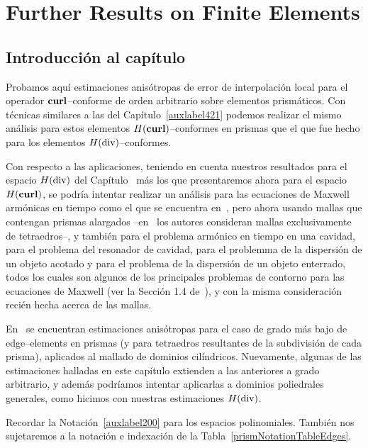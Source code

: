 \chapter{Further Results on Finite Elements}
\label{auxlabel202}
\section*{Introducci\'on al cap\'itulo}

Probamos aqu\'i estimaciones anis\'otropas de error de interpolaci\'on local
para el operador $\textbf{curl}$--conforme de orden arbitrario sobre elementos
prism\'aticos. 
Con t\'ecnicas similares a las del Cap\'itulo~\ref{auxlabel421}
podemos realizar el mismo 
an\'alisis para estos elementos $H(\textbf{curl})$--conformes en prismas
que el que fue hecho para los elementos $H(\operatorname{\textrm{div}})$--conformes.

Con respecto a las aplicaciones, 
teniendo en cuenta nuestros resultados para el espacio $H(\operatorname{\textrm{div}})$ 
del Cap\'itulo~\cite{auxlabel421} m\'as los que presentaremos
ahora para el espacio $H(\textbf{curl})$, se podr\'ia intentar realizar
un an\'alisis para las ecuaciones de Maxwell arm\'onicas en tiempo
como el que se encuentra en~\cite{buffaCostabelDauge}, pero
ahora usando mallas que contengan prismas alargados 
--en~\cite{buffaCostabelDauge} los autores consideran
mallas exclusivamente de tetraedros--, y tambi\'en 
para el problema arm\'onico en tiempo en una cavidad,
para el problema del resonador de cavidad, para el problemma
de la dispersi\'on de un objeto acotado y para el problema
de la dispersi\'on de un objeto enterrado, todos los cuales
son algunos de los principales problemas de contorno
para las ecuaciones de Maxwell
(ver la Secci\'on 1.4 de~\cite{monk}), 
y con la misma consideraci\'on
reci\'en hecha acerca de las mallas.

En~\cite{MR1860445} se encuentran estimaciones anis\'otropas
para el caso de grado m\'as bajo de edge--elements en prismas
(y para tetraedros resultantes de la subdivisi\'on de cada prisma),
aplicados al mallado de dominios cil\'indricos.
Nuevamente, algunas de las estimaciones halladas 
en este cap\'itulo extienden a las anteriores a grado arbitrario,
y adem\'as podr\'iamos intentar aplicarlas a dominios poliedrales 
generales, como hicimos con nuestras estimaciones $H(\operatorname{\textrm{div}})$.

Recordar la Notaci\'on~\ref{auxlabel200} para los espacios polinomiales. 
Tambi\'en nos sujetaremos a la notaci\'on e indexaci\'on de la  
Tabla~\ref{prismNotationTableEdges}.

